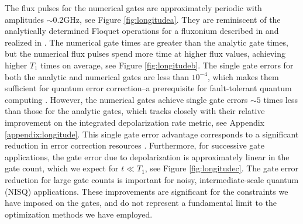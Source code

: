 The flux pulses for the numerical gates
are approximately periodic
with amplitudes $\sim 0.2 \textrm{GHz}$, see Figure \ref{fig:longitudea}.
They are reminiscent of the analytically determined Floquet operations
for a fluxonium described in \cite{huang2020engineering}
and realized in \cite{mundada2020floquet}.
The numerical gate times are greater
than the analytic gate times, but the
numerical flux pulses
spend more time at higher flux values, achieving higher $T_{1}$ times on average,
see Figure \ref{fig:longitudeb}.
The single gate errors for both the analytic and numerical gates are
less than $10^{-4}$, which makes them sufficient for quantum error correction--a
prerequisite for fault-tolerant quantum
computing \cite{aharonov2008fault, knill2005quantum, gottesman1997stabilizer}.
However, the numerical gates achieve single gate errors
$\sim 5$ times less than those for the analytic gates,
which tracks closely with their relative improvement
on the integrated depolarization rate metric, see Appendix \ref{appendix:longitude}.
This single gate error advantage corresponds to a
significant reduction in error correction resources
\cite{paetznick2014resource, suchara2013comparing}.
Furthermore, for successive gate applications,
the gate error due to depolarization is approximately linear
in the gate count, which we expect for $t \ll T_{1}$, see Figure \ref{fig:longitudec}.
The gate error reduction for large gate counts is
important for noisy, intermediate-scale quantum (NISQ)
applications. These improvements are significant for the constraints
we have imposed on the gates,
and do not represent a fundamental limit to the optimization
methods we have employed.

